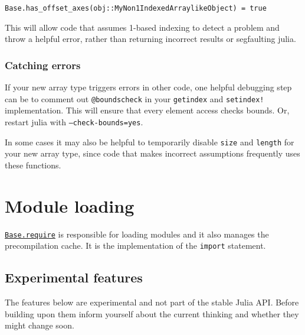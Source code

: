 \begin{verbatim}
Base.has_offset_axes(obj::MyNon1IndexedArraylikeObject) = true
\end{verbatim}



This will allow code that assumes 1-based indexing to detect a problem and throw a helpful error, rather than returning incorrect results or segfaulting julia.



\hypertarget{12667413576127681892}{}


\subsubsection{Catching errors}



If your new array type triggers errors in other code, one helpful debugging step can be to comment out \texttt{@boundscheck} in your \texttt{getindex} and \texttt{setindex!} implementation. This will ensure that every element access checks bounds. Or, restart julia with \texttt{--check-bounds=yes}.



In some cases it may also be helpful to temporarily disable \texttt{size} and \texttt{length} for your new array type, since code that makes incorrect assumptions frequently uses these functions.



\hypertarget{860188194179028487}{}


\section{Module loading}



\hyperlink{16690217505788642360}{\texttt{Base.require}} is responsible for loading modules and it also manages the precompilation cache. It is the implementation of the \texttt{import} statement.



\hypertarget{8895570116735182580}{}


\subsection{Experimental features}



The features below are experimental and not part of the stable Julia API. Before building upon them inform yourself about the current thinking and whether they might change soon.



